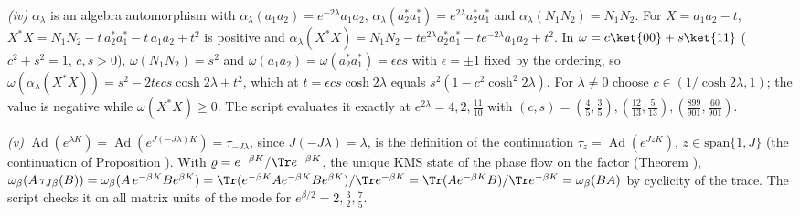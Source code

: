 \emph{(iv)} $\alpha_{\lambda}$ is an algebra automorphism with $\alpha_{\lambda}(a_{1}a_{2}) = e^{-2\lambda}a_{1}a_{2}$, $\alpha_{\lambda}(a_{2}^{*}a_{1}^{*}) = e^{2\lambda}a_{2}^{*}a_{1}^{*}$ and $\alpha_{\lambda}(N_{1}N_{2}) = N_{1}N_{2}$. For $X = a_{1}a_{2} - t$, $X^{*}X = N_{1}N_{2} - t\,a_{2}^{*}a_{1}^{*} - t\,a_{1}a_{2} + t^{2}$ is positive and $\alpha_{\lambda}(X^{*}X) = N_{1}N_{2} - te^{2\lambda}a_{2}^{*}a_{1}^{*} - te^{-2\lambda}a_{1}a_{2} + t^{2}$. In $\omega = c\ket{00} + s\ket{11}$ ($c^{2} + s^{2} = 1$, $c, s > 0$), $\omega(N_{1}N_{2}) = s^{2}$ and $\omega(a_{1}a_{2}) = \omega(a_{2}^{*}a_{1}^{*}) = \epsilon cs$ with $\epsilon = \pm 1$ fixed by the ordering, so $\omega(\alpha_{\lambda}(X^{*}X)) = s^{2} - 2t\epsilon cs\cosh 2\lambda + t^{2}$, which at $t = \epsilon cs\cosh 2\lambda$ equals $s^{2}(1 - c^{2}\cosh^{2}2\lambda)$. For $\lambda \neq 0$ choose $c \in (1/\cosh 2\lambda, 1)$; the value is negative while $\omega(X^{*}X) \ge 0$. The script evaluates it exactly at $e^{2\lambda} = 4, 2, \tfrac{11}{10}$ with $(c,s) = (\tfrac45, \tfrac35), (\tfrac{12}{13}, \tfrac{5}{13}), (\tfrac{899}{901}, \tfrac{60}{901})$.

\emph{(v)} $\operatorname{Ad}(e^{\lambda K}) = \operatorname{Ad}(e^{J(-J\lambda)K}) = \tau_{-J\lambda}$, since $J(-J\lambda) = \lambda$, is the definition of the continuation $\tau_{z} = \operatorname{Ad}(e^{JzK})$, $z \in \mathrm{span}\{1, J\}$ (the continuation of Proposition ). With $\varrho = e^{-\beta K}/\Tr e^{-\beta K}$, the unique KMS state of the phase flow on the factor (Theorem ), $\omega_{\beta}(A\,\tau_{J\beta}(B)) = \omega_{\beta}(A\,e^{-\beta K}Be^{\beta K}) = \Tr(e^{-\beta K}Ae^{-\beta K}Be^{\beta K})/\Tr e^{-\beta K} = \Tr(Ae^{-\beta K}B)/\Tr e^{-\beta K} = \omega_{\beta}(BA)$ by cyclicity of the trace. The script checks it on all matrix units of the mode for $e^{\beta/2} = 2, \tfrac32, \tfrac75$.

